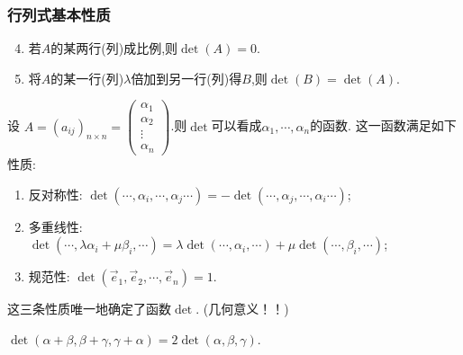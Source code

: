 





\begin{frame}\frametitle{行列式基本性质}
\begin{corollary}
\begin{enumerate}\setcounter{enumi}{3}
\item 若$A$的某两行(列)成比例,则$\det(A)=0$. \pp
\item 将$A$的某一行(列)$\lambda$倍加到另一行(列)得$B$,则$\det(B)=\det(A)$.
\end{enumerate}
\end{corollary}
\pp
{}
\pp

设 $A=(a_{ij})_{n\times n} = \begin{pmatrix}\alpha_1\\\alpha_2\\\vdots\\\alpha_n\end{pmatrix}$.则$\det$可以看成$\alpha_1,\cdots,\alpha_n$的函数. \pp  这一函数满足如下性质:
{\small
\begin{enumerate}
\item 反对称性: $\det(\cdots,\alpha_i,\cdots,\alpha_j\cdots)=-\det(\cdots,\alpha_j,\cdots,\alpha_i\cdots)$; \pp
\item 多重线性:  \\
$\det(\cdots,\lambda\alpha_i+\mu\beta_i,\cdots) = \lambda\det(\cdots,\alpha_i,\cdots) + \mu\det(\cdots,\beta_i,\cdots)$;
\pp
\item 规范性: $\det(\vec{e}_1,\vec{e}_2,\cdots,\vec{e}_n)=1$.
\end{enumerate}
}
\pp
{} 这三条性质唯一地确定了函数$\det$. (几何意义！！)
\pp

 $\det(\alpha+\beta,\beta+\gamma,\gamma+\alpha)=2\det(\alpha,\beta,\gamma)$.
\end{frame}





